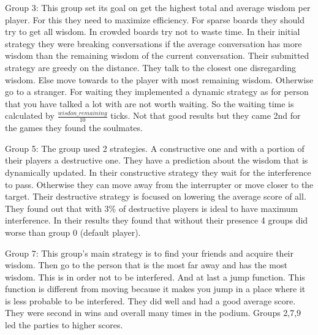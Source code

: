 Group 3:
This group set its goal on get the highest total and average wisdom per player.
For this they need to maximize efficiency. For sparse boards they should try to
get all wisdom. In crowded boards try not to waste time. In their initial strategy
they were breaking conversations if the average conversation has more wisdom than
the remaining wisdom of the current conversation. Their submitted strategy are 
greedy on the distance. They talk to the closest one disregarding wisdom. Else
move towards to the player with most remaining wisdom. Otherwise go to a stranger.
For waiting they implemented a dynamic strategy as for person that you have talked
a lot with are not worth waiting. So the waiting time is calculated by 
$\frac{wisdon\_remaining}{10}$ ticks. Not that good results but they came 2nd for
the games they found the soulmates.

Group 5:
The group used 2 strategies. A constructive one and with a portion of their players
a destructive one. They have a prediction about the wisdom that is dynamically 
updated. In their constructive strategy they wait for the interference to pass.
Otherwise they can move away from the interrupter or move closer to the target.
Their destructive strategy is focused on lowering the average score of all.
They found out that with 3\% of destructive players is ideal to have maximum 
interference. In their results they found that without their presence 4 groups
did worse than group 0 (default player).

Group 7:
This group's main strategy is to find your friends and acquire their wisdom. Then
go to the person that is the most far away and has the most wisdom. This is in 
order not to be interfered. And at last a jump function. This function is 
different from moving because it makes you jump in a place where it is less 
probable to be interfered. They did well and had a good average score. They were
second in wins and overall many times in the podium. Groups 2,7,9 led the parties 
to higher scores.

